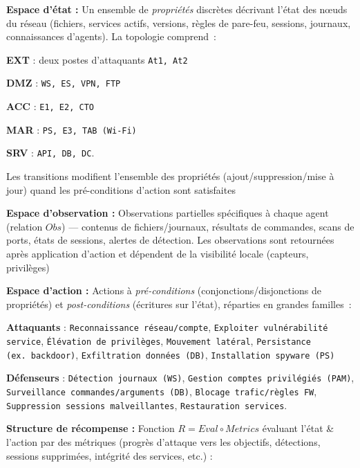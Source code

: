\begin{enumerate*}[label={\roman*)}, itemjoin={; \quad}]
  \item \textbf{Espace d'état :} Un ensemble de \emph{propriétés} discrètes décrivant l’état des nœuds du réseau (fichiers, services actifs, versions, règles de pare-feu, sessions, journaux, connaissances d’agents). La topologie comprend~:
  \begin{enumerate*}[label={\alph*)}, itemjoin={; \ }]
    \item \textbf{EXT} : deux postes d’attaquants \texttt{At1, At2}
    \item \textbf{DMZ} : \texttt{WS, ES, VPN, FTP}
    \item \textbf{ACC} : \texttt{E1, E2, CTO}
    \item \textbf{MAR} : \texttt{PS, E3, TAB (Wi-Fi)}
    \item \textbf{SRV} : \texttt{API, DB, DC}.
  \end{enumerate*}
  Les transitions modifient l’ensemble des propriétés (ajout/suppression/mise à jour) quand les pré-conditions d’action sont satisfaites
  \item \textbf{Espace d'observation :} Observations partielles spécifiques à chaque agent (relation $Obs$) — contenus de fichiers/journaux, résultats de commandes, scans de ports, états de sessions, alertes de détection. Les observations sont retournées après application d’action et dépendent de la visibilité locale (capteurs, privilèges)
  \item \textbf{Espace d'action :} Actions à \emph{pré-conditions} (conjonctions/disjonctions de propriétés) et \emph{post-conditions} (écritures sur l’état), réparties en grandes familles~:
  \begin{enumerate*}[label={\alph*)}, itemjoin={; \ }]
    \item \textbf{Attaquants} : \texttt{Reconnaissance réseau/compte}, \texttt{Exploiter vulnérabilité service}, \texttt{Élévation de privilèges}, \texttt{Mouvement latéral}, \texttt{Persistance (ex.~backdoor)}, \texttt{Exfiltration données (DB)}, \texttt{Installation spyware (PS)}
    \item \textbf{Défenseurs} : \texttt{Détection journaux (WS)}, \texttt{Gestion comptes privilégiés (PAM)}, \texttt{Surveillance commandes/arguments (DB)}, \texttt{Blocage trafic/règles FW}, \texttt{Suppression sessions malveillantes}, \texttt{Restauration services}.
  \end{enumerate*}
  \item \textbf{Structure de récompense :} Fonction $R = Eval \circ Metrics$ évaluant l’état \& l’action par des métriques (progrès d’attaque vers les objectifs, détections, sessions supprimées, intégrité des services, etc.) :

\end{enumerate*}
